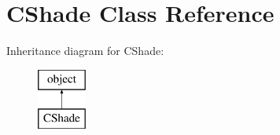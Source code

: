\hypertarget{class_c_shade_1_1_c_shade}{}\section{C\+Shade Class Reference}
\label{class_c_shade_1_1_c_shade}
Inheritance diagram for C\+Shade\+:\begin{figure}[H]
\begin{center}
\leavevmode
\includegraphics[height=2.000000cm]{class_c_shade_1_1_c_shade}
\end{center}
\end{figure}

